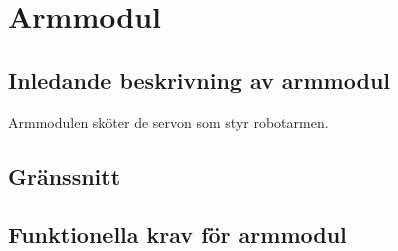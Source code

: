 \section{Armmodul}

\subsection{Inledande beskrivning av armmodul}
Armmodulen sköter de servon som styr robotarmen.

\subsection{Gränssnitt}
\begin{LIPSkravlista}
\end{LIPSkravlista}

\subsection{Funktionella krav för armmodul}
\begin{LIPSkravlista}
\end{LIPSkravlista}

